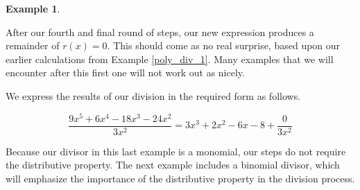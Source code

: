 \documentclass[12pt]{book}
\theoremstyle{definition}
\newtheorem{example}{Example}
\begin{document}
\begin{example}
\begin{multicols}{2}


\columnbreak

After our fourth and final round of steps, our new expression produces a remainder of $r(x)=0$.  This should come as no real surprise, based upon our earlier calculations from Example \ref{poly_div_1}.  Many examples that we will encounter after this first one will not work out as nicely.
\par
We express the results of our division in the required form as follows.
\end{multicols}

$$\dfrac{9x^5+6x^4-18x^3-24x^2}{3x^2}=3x^3+2x^2-6x-8+\dfrac{0}{3x^2}$$

\end{example}

Because our divisor in this last example is a monomial, our steps do not require the distributive property.  The next example includes a binomial divisor, which will emphasize the importance of the distributive property in the division process.
\end{document}
